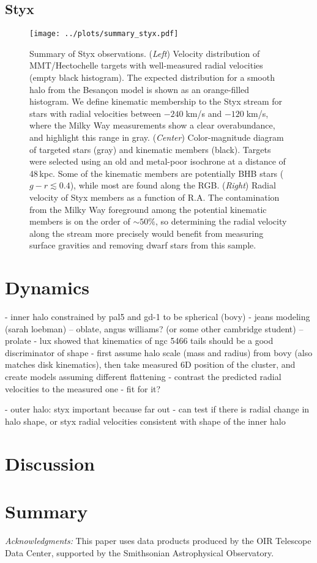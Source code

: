 \documentclass[modern]{aastex61}
\begin{document}
\subsection{Styx}
\label{sec:styx}

\begin{figure}
\begin{center}
\texttt{[image: ../plots/summary\_styx.pdf]}
\caption{Summary of Styx observations.
(\emph{Left}) Velocity distribution of MMT/Hectochelle targets with well-measured radial velocities (empty black histogram).
The expected distribution for a smooth halo from the Besan\c{c}on model is shown as an orange-filled histogram.
We define kinematic membership to the Styx stream for stars with radial velocities between $-240\;$km/s and $-120\;$km/s, where the Milky Way measurements show a clear overabundance, and highlight this range in gray.
(\emph{Center}) Color-magnitude diagram of targeted stars (gray) and kinematic members (black).
Targets were selected using an old and metal-poor isochrone at a distance of 48\,kpc.
Some of the kinematic members are potentially BHB stars ($g-r\lesssim0.4$), while most are found along the RGB.
(\emph{Right}) Radial velocity of Styx members as a function of R.A.
The contamination from the Milky Way foreground among the potential kinematic members is on the order of $\sim50\%$, so determining the radial velocity along the stream more precisely would benefit from measuring surface gravities and removing dwarf stars from this sample.}
\label{fig:summary_styx}
\end{center}
\end{figure}

\section{Dynamics}
\label{sec:dynamics}
- inner halo constrained by pal5 and gd-1 to be spherical (bovy)
- jeans modeling (sarah loebman) -- oblate, angus williams? (or some other cambridge student) -- prolate
- lux showed that kinematics of ngc 5466 tails should be a good discriminator of shape
- first assume halo scale (mass and radius) from bovy (also matches disk kinematics), then take measured 6D position of the cluster, and create models assuming different flattening
- contrast the predicted radial velocities to the measured one
- fit for it?

- outer halo: styx important because far out
- can test if there is radial change in halo shape, or styx radial velocities consistent with shape of the inner halo

\section{Discussion}
\label{sec:discussion}

\section{Summary}
\label{sec:summary}

\vspace{0.5cm}
\emph{Acknowledgments:}
This paper uses data products produced by the OIR Telescope Data Center, supported by the Smithsonian Astrophysical Observatory.


\end{document}
